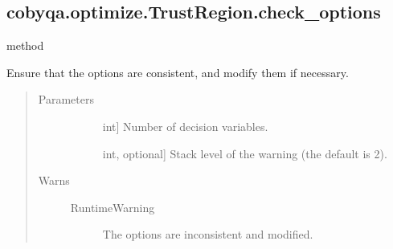 \documentclass[letterpaper,10pt,english]{sphinxmanual}
\begin{document}
\begin{fulllineitems}
\begin{fulllineitems}
\begin{quote}
\begin{description}
\end{description}\end{quote}

\end{fulllineitems}



\subsection{cobyqa.optimize.TrustRegion.check\_options}
\label{\detokenize{refs/generated/cobyqa.optimize.TrustRegion.check_options:cobyqa-optimize-trustregion-check-options}}\label{\detokenize{refs/generated/cobyqa.optimize.TrustRegion.check_options::doc}}
\sphinxAtStartPar
method

\begin{fulllineitems}
\label{\detokenize{refs/generated/cobyqa.optimize.TrustRegion.check_options:cobyqa.optimize.TrustRegion.check_options}}
\sphinxAtStartPar
Ensure that the options are consistent, and modify them if necessary.
\begin{quote}\begin{description}
\item[{Parameters}] \leavevmode\begin{description}
\item[{}] \leavevmode{[}int{]}
\sphinxAtStartPar
Number of decision variables.

\item[{}] \leavevmode{[}int, optional{]}
\sphinxAtStartPar
Stack level of the warning (the default is 2).

\end{description}

\item[{Warns}] \leavevmode\begin{description}
\item[{RuntimeWarning}] \leavevmode
\sphinxAtStartPar
The options are inconsistent and modified.

\end{description}

\end{description}\end{quote}


\end{fulllineitems}
\end{fulllineitems}
\end{document}
